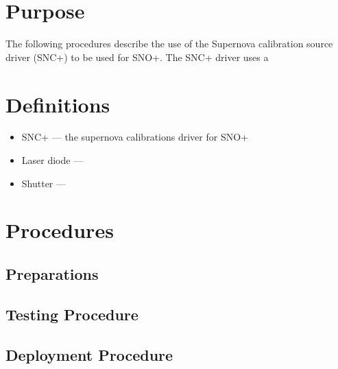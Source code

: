 
\section{Purpose}

The following procedures describe the use of the Supernova calibration
source driver (SNC+) to be used for SNO+. The SNC+ driver uses a 

\section{Definitions}

\begin{itemize}
\item SNC+ --- the supernova calibrations driver for SNO+
\item Laser diode ---
\item Shutter ---
\end{itemize}
  
\section{Procedures}

\subsection{Preparations}

\subsection{Testing Procedure}

\subsection{Deployment Procedure}

